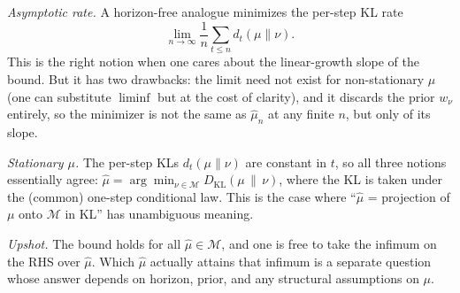 \documentclass[fontsize=11pt, parskip=half]{scrartcl}
\newcommand{\Mc}{\mathcal{M}}
\begin{document}
\textit{Asymptotic rate.} A horizon-free analogue minimizes the per-step KL
rate $$\lim_{n \to \infty} \frac{1}{n} \sum_{t \leq n} d_t(\mu \parallel \nu).$$ This is the right notion when one cares about the linear-growth slope of the bound. But it has two drawbacks: the limit need not exist for non-stationary $\mu$ (one can substitute $\liminf$ but at the cost of clarity), and it discards the prior $w_\nu$ entirely, so the minimizer is not the same as $\hat\mu_n$ at any finite $n$, but only of its slope.

\textit{Stationary $\mu$.} The per-step KLs $d_t(\mu \parallel \nu)$ are constant in $t$, so all three notions essentially agree: $\hat\mu = \arg\min_{\nu \in \Mc} D_{\text{KL}}(\mu \,\|\, \nu)$, where the KL is taken under the (common) one-step conditional law. This is the case where ``$\hat\mu$ = projection of $\mu$ onto $\Mc$ in KL'' has unambiguous meaning.

\textit{Upshot.} The bound holds for all $\hat\mu \in \Mc$, and one is free
to take the infimum on the RHS over $\hat\mu$. Which $\hat\mu$ actually
attains that infimum is a separate question whose answer depends on horizon,
prior, and any structural assumptions on $\mu$.



\end{document}
